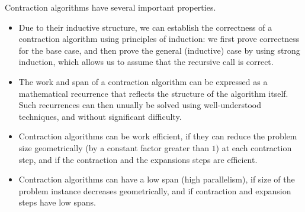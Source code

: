 \begin{cluster}
\label{grp:grm:design::contraction::properties-of-contraction}

\begin{gram}
\label{grm:design::contraction::properties-of-contraction}
Contraction algorithms have several important properties.  

\begin{itemize}
\item Due to their inductive structure, we can establish the
  correctness of a contraction algorithm using principles of
  induction: we first prove correctness for the base case, and then
  prove the general (inductive) case by using strong induction, which
  allows us to assume that the recursive call is correct.

\item 
The work and span of a contraction algorithm can be expressed as a
mathematical recurrence that reflects the structure of the algorithm
itself. Such recurrences can then unually be solved using
well-understood techniques, and without significant difficulty.

\item 
Contraction algorithms can be work efficient, if they can reduce the
problem size geometrically (by a constant factor greater than $1$) at
each contraction step, and if the contraction and the expansions steps
are efficient.

\item Contraction algorithms can have a low span (high parallelism),
  if size of the problem instance decreases geometrically, and if
  contraction and expansion steps have low spans.

\end{itemize}

\end{gram}
\end{cluster}

